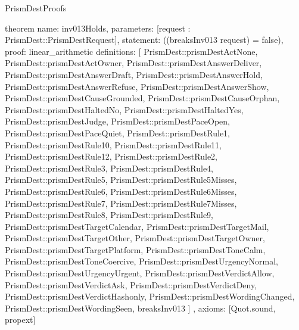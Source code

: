 \begin{lexlean}{PrismDestProofs}
\begin{semanticmodule}
theorem{
  name: inv013Holds,
  parameters: [request : PrismDest::PrismDestRequest],
  statement: ((breaksInv013 request) = false),
  proof: linear_arithmetic{
    definitions: [
      PrismDest::prismDestActNone,
      PrismDest::prismDestActOwner,
      PrismDest::prismDestAnswerDeliver,
      PrismDest::prismDestAnswerDraft,
      PrismDest::prismDestAnswerHold,
      PrismDest::prismDestAnswerRefuse,
      PrismDest::prismDestAnswerShow,
      PrismDest::prismDestCauseGrounded,
      PrismDest::prismDestCauseOrphan,
      PrismDest::prismDestHaltedNo,
      PrismDest::prismDestHaltedYes,
      PrismDest::prismDestJudge,
      PrismDest::prismDestPaceOpen,
      PrismDest::prismDestPaceQuiet,
      PrismDest::prismDestRule1,
      PrismDest::prismDestRule10,
      PrismDest::prismDestRule11,
      PrismDest::prismDestRule12,
      PrismDest::prismDestRule2,
      PrismDest::prismDestRule3,
      PrismDest::prismDestRule4,
      PrismDest::prismDestRule5,
      PrismDest::prismDestRule5Misses,
      PrismDest::prismDestRule6,
      PrismDest::prismDestRule6Misses,
      PrismDest::prismDestRule7,
      PrismDest::prismDestRule7Misses,
      PrismDest::prismDestRule8,
      PrismDest::prismDestRule9,
      PrismDest::prismDestTargetCalendar,
      PrismDest::prismDestTargetMail,
      PrismDest::prismDestTargetOther,
      PrismDest::prismDestTargetOwner,
      PrismDest::prismDestTargetPlatform,
      PrismDest::prismDestToneCalm,
      PrismDest::prismDestToneCoercive,
      PrismDest::prismDestUrgencyNormal,
      PrismDest::prismDestUrgencyUrgent,
      PrismDest::prismDestVerdictAllow,
      PrismDest::prismDestVerdictAsk,
      PrismDest::prismDestVerdictDeny,
      PrismDest::prismDestVerdictHashonly,
      PrismDest::prismDestWordingChanged,
      PrismDest::prismDestWordingSeen,
      breaksInv013
    ]
  },
  axioms: [Quot.sound, propext]
}
\end{semanticmodule}
\end{lexlean}
